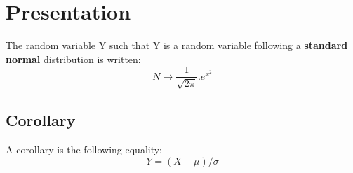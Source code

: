 \section{\bf{Presentation}}
The random variable Y such that Y is a random variable following a \textbf{standard normal} distribution is written:
 $$ N\rightarrow\frac{1}{\sqrt{2\pi}}.e^{x^2}$$
\subsection{Corollary}
A corollary is the following equality:
$$Y = (X - \mu)/\sigma$$